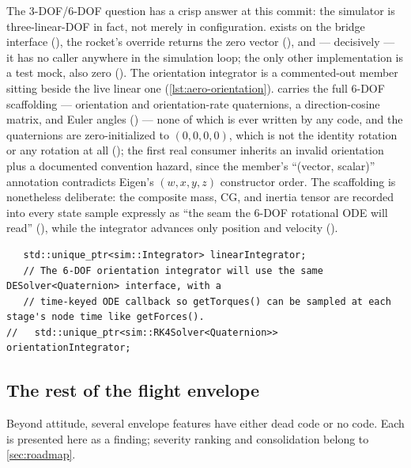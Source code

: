 The 3-DOF/6-DOF question has a crisp answer at this commit: the simulator is three-linear-DOF in
fact, not merely in configuration.  exists on the  bridge
interface (), the rocket's override returns the zero vector
(), and --- decisively --- it has no caller anywhere in the
simulation loop; the only other implementation is a test mock, also zero
(). The orientation integrator is a commented-out member
sitting beside the live linear one (\cref{lst:aero-orientation}).  carries the full
6-DOF scaffolding --- orientation and orientation-rate quaternions, a direction-cosine matrix, and
Euler angles () --- none of which is ever written by any code, and the
quaternions are zero-initialized to $(0,0,0,0)$, which is not the identity rotation or any rotation
at all (); the first real consumer inherits an invalid orientation plus a
documented convention hazard, since the member's ``(vector, scalar)'' annotation contradicts
Eigen's $(w,x,y,z)$ constructor order. The scaffolding is nonetheless deliberate: the composite
mass, CG, and inertia tensor are recorded into every state sample expressly as ``the seam the
6-DOF rotational ODE will read'' (), while the integrator advances only
position and velocity ().

\begin{listing}[htbp]
\begin{verbatim}
   std::unique_ptr<sim::Integrator> linearIntegrator;
   // The 6-DOF orientation integrator will use the same DESolver<Quaternion> interface, with a
   // time-keyed ODE callback so getTorques() can be sampled at each stage's node time like getForces().
//   std::unique_ptr<sim::RK4Solver<Quaternion>> orientationIntegrator;
\end{verbatim}
\caption{The clearest single statement of the 3-DOF reality: the orientation integrator is a
pre-designed, commented-out member beside the live linear one
().}\label{lst:aero-orientation}
\end{listing}

\subsection{The rest of the flight envelope}\label{sec:aero-envelope}

Beyond attitude, several envelope features have either dead code or no code. Each is presented
here as a finding; severity ranking and consolidation belong to \cref{sec:roadmap}.

